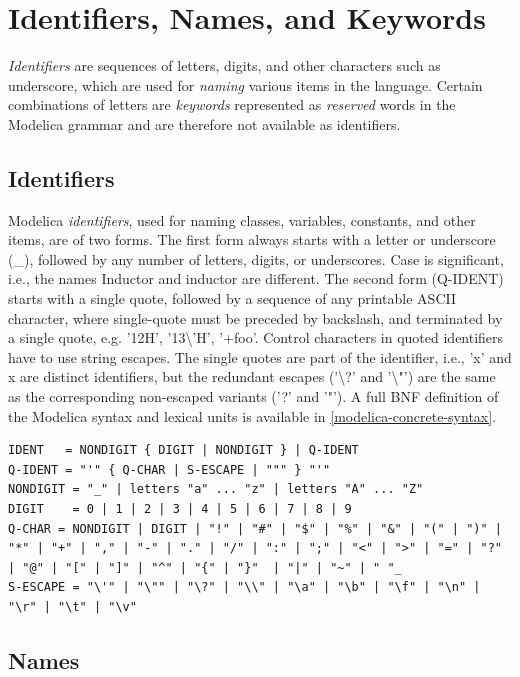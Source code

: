 \documentclass[10pt,a4paper]{report}
\def\doublelabel#1{\label{#1}}
\begin{document}
\section{Identifiers, Names, and Keywords}\doublelabel{identifiers-names-and-keywords}

\emph{Identifiers} are sequences of letters, digits, and other
characters such as underscore, which are used for \emph{naming} various
items in the language. Certain combinations of letters are
\emph{keywords} represented as \emph{reserved} words in the Modelica
grammar and are therefore not available as identifiers.

\subsection{Identifiers}\doublelabel{identifiers}

Modelica \emph{identifiers}, used for naming classes, variables,
constants, and other items, are of two forms. The first form always
starts with a letter or underscore (\_), followed by any number of
letters, digits, or underscores. Case is significant, i.e., the names
Inductor and inductor are different. The second form (Q-IDENT) starts
with a single quote, followed by a sequence of any printable ASCII
character, where single-quote must be preceded by backslash, and
terminated by a single quote, e.g. '12H', '13\textbackslash{}'H',
'+foo'. Control characters in quoted identifiers have to use string
escapes. The single quotes are part of the identifier, i.e., 'x' and x
are distinct identifiers, but the redundant escapes ('\textbackslash{}?'
and '\textbackslash{}"') are the same as the corresponding non-escaped
variants ('?' and '"'). A full BNF definition of the Modelica syntax and
lexical units is available in \ref{modelica-concrete-syntax}.

\begin{lstlisting}[language=grammar]
IDENT   = NONDIGIT { DIGIT | NONDIGIT } | Q-IDENT
Q-IDENT = "'" { Q-CHAR | S-ESCAPE | """ } "'"
NONDIGIT = "_" | letters "a" ... "z" | letters "A" ... "Z"
DIGIT    = 0 | 1 | 2 | 3 | 4 | 5 | 6 | 7 | 8 | 9
Q-CHAR = NONDIGIT | DIGIT | "!" | "#" | "$" | "%" | "&" | "(" | ")" | "*" | "+" | "," | "-" | "." | "/" | ":" | ";" | "<" | ">" | "=" | "?" | "@" | "[" | "]" | "^" | "{" | "}"  | "|" | "~" | " "_
S-ESCAPE = "\'" | "\"" | "\?" | "\\" | "\a" | "\b" | "\f" | "\n" | "\r" | "\t" | "\v"
\end{lstlisting}

\subsection{Names}\doublelabel{names}
\end{document}
